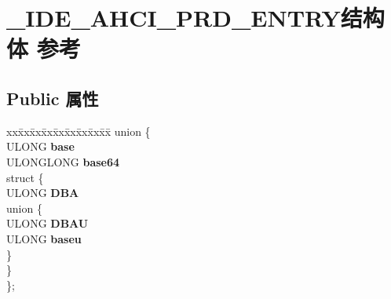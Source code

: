 \hypertarget{struct___i_d_e___a_h_c_i___p_r_d___e_n_t_r_y}{}\section{\+\_\+\+I\+D\+E\+\_\+\+A\+H\+C\+I\+\_\+\+P\+R\+D\+\_\+\+E\+N\+T\+R\+Y结构体 参考}
\label{struct___i_d_e___a_h_c_i___p_r_d___e_n_t_r_y}
\subsection*{Public 属性}
\begin{DoxyCompactItemize}
\item 
\mbox{\label{struct___i_d_e___a_h_c_i___p_r_d___e_n_t_r_y_ad7f8b558e307b0b62eb619321f78cfd6}} 
\begin{tabbing}
xx\=xx\=xx\=xx\=xx\=xx\=xx\=xx\=xx\=\kill
union \{\\
\>ULONG {\bfseries base}\\
\>ULONGLONG {\bfseries base64}\\
\mbox{\label{union___i_d_e___a_h_c_i___p_r_d___e_n_t_r_y_1_1_0D1048_aa4167507909857eccba37cc6ee80dfa7}} 
\>struct \{\\
\>\>ULONG {\bfseries DBA}\\
\mbox{\label{struct___i_d_e___a_h_c_i___p_r_d___e_n_t_r_y_1_1_0D1048_1_1_0D1052_a9076b7172e397a29ee4c89cc25a26ff5}} 
\>\>union \{\\
\>\>\>ULONG {\bfseries DBAU}\\
\>\>\>ULONG {\bfseries baseu}\\
\>\>\} \\
\>\} \\
\}; \\


\end{tabbing}
\end{DoxyCompactItemize}
